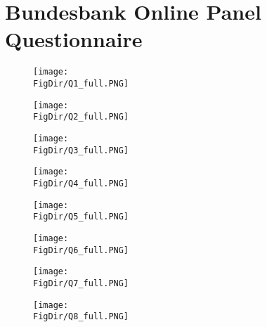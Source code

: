 \documentclass[\econtexRoot/ProjectABM]{subfiles}
\begin{document}
\let\TableWidth\relax
{\newlength\TableWidth}

\section{Bundesbank Online Panel Questionnaire}\label{sec:ApndxQuestionnaire}

\begin{figure}
	\centering
	\texttt{[image: \\FigDir/Q1\_full.PNG]}
\end{figure}
\begin{figure}
	\centering
	\texttt{[image: \\FigDir/Q2\_full.PNG]}
\end{figure}
\begin{figure}
	\centering
	\texttt{[image: \\FigDir/Q3\_full.PNG]}
\end{figure}
\begin{figure}
	\centering
	\texttt{[image: \\FigDir/Q4\_full.PNG]}
\end{figure}
\begin{figure}
	\centering
	\texttt{[image: \\FigDir/Q5\_full.PNG]}
\end{figure}
\begin{figure}
	\centering
	\texttt{[image: \\FigDir/Q6\_full.PNG]}
\end{figure}
\begin{figure}
	\centering
	\texttt{[image: \\FigDir/Q7\_full.PNG]}
\end{figure}
\begin{figure}
	\centering
	\texttt{[image: \\FigDir/Q8\_full.PNG]}
\end{figure}

\onlyinsubfile{\pagebreak}
\end{document}
